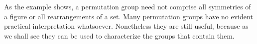 As the example shows, a permutation group need not comprise all symmetries of a figure or all rearrangements of a set. Many permutation groups have no evident practical interpretation whatsoever. Nonetheless they are still useful, because as we shall see they can be used to characterize the groups that contain them.
 



